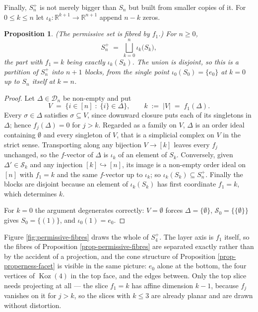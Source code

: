 \documentclass[11pt, a4paper, abstract=yes]{scrartcl}
\theoremstyle{definition}
\theoremstyle{remark}
\theoremstyle{plain}
\newtheorem{proposition}[definition]{Proposition}
\newcommand{\Koz}{\operatorname{Koz}}
\newcommand{\leandiscof}[1]{\tikz[baseline=-0.6ex]\fill[#1] (0,0) circle (0.6ex);}
\newcommand{\leanfull}{\leandiscof{leanfull}}
\newcommand{\leanmark}[1]{\leavevmode{\reversemarginpar\marginnote{\raggedleft#1}}}
\begin{document}
Finally, \(S_n^{+}\) is not merely bigger than \(S_n\) but built from smaller copies of it. For
\(0\le k\le n\) let \(\iota_k:\mathbb R^{k+1}\to\mathbb R^{n+1}\) append \(n-k\) zeros.

\begin{proposition}
\leanmark{\leanfull}(\emph{The permissive set is fibred by \(f_1\).}) For \(n\ge0\),
\begin{equation}\label{eq:permissive-fibres}
  S_n^{+}\;=\;\bigsqcup_{k=0}^{n}\iota_k\bigl(S_k\bigr),
\end{equation}
the part with \(f_1=k\) being exactly \(\iota_k(S_k)\). The union is disjoint, so this is a partition
of \(S_n^{+}\) into \(n+1\) blocks, from the single point \(\iota_0(S_0)=\lbrace e_0\rbrace\) at
\(k=0\) up to \(S_n\) itself at \(k=n\).
\label{prop:permissive-fibres}
\label{prop-permissive-fibres}
\end{proposition}

\begin{proof}
Let \(\Delta\in\mathcal D_n\) be non-empty and put
\begin{equation}\label{eq:fibres-support}
  V\;=\;\bigl\lbrace i\in[n]\;:\;\lbrace i\rbrace\in\Delta\bigr\rbrace,
  \qquad
  k\;:=\;\lvert V\rvert\;=\;f_1(\Delta).
\end{equation}
Every \(\sigma\in\Delta\) satisfies \(\sigma\subseteq V\), since downward
closure puts each of its singletons in \(\Delta\); hence \(f_j(\Delta)=0\) for \(j>k\). Regarded as a
family on \(V\), \(\Delta\) is an order ideal containing \(\emptyset\) and every singleton of \(V\),
that is a simplicial complex on \(V\) in the strict sense. Transporting along any bijection
\(V\to[k]\) leaves every \(f_j\) unchanged, so the \(f\)-vector of \(\Delta\) is \(\iota_k\) of an
element of \(S_k\). Conversely, given \(\Delta'\in\mathcal S_k\) and any injection \([k]\hookrightarrow[n]\),
its image is a non-empty order ideal on \([n]\) with \(f_1=k\) and the same \(f\)-vector up to
\(\iota_k\); so \(\iota_k(S_k)\subseteq S_n^{+}\). Finally the blocks are disjoint because an element of
\(\iota_k(S_k)\) has first coordinate \(f_1=k\), which determines \(k\).

For \(k=0\) the argument degenerates correctly: \(V=\emptyset\) forces \(\Delta=\lbrace\emptyset\rbrace\),
\(\mathcal S_0=\lbrace\lbrace\emptyset\rbrace\rbrace\) gives \(S_0=\lbrace(1)\rbrace\), and
\(\iota_0(1)=e_0\).
\end{proof}

Figure \ref{fig:permissive-fibres} draws the whole of \(S_4^{+}\). The layer axis is \(f_1\)
itself, so the fibres of Proposition \ref{prop-permissive-fibres} are separated exactly rather than by
the accident of a projection, and the cone structure of Proposition \ref{prop-properness-facet} is
visible in the same picture: \(e_0\) alone at the bottom, the four vertices of \(\Koz(4)\) in the top
face, and the edges between. Only the top slice needs projecting at all --- the slice \(f_1=k\) has
affine dimension \(k-1\), because \(f_j\) vanishes on it for \(j>k\), so the slices with \(k\le3\)
are already planar and are drawn without distortion.
\end{document}
